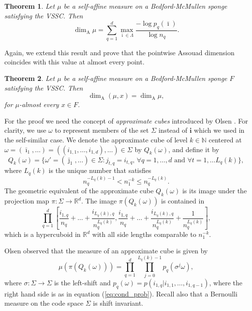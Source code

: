 \documentclass{PRM}
\newcommand{\field}[1]{\mathbb{#1}}
\newcommand{\N}{\field{N}}
\newcommand{\R}{\field{R}}
\theoremstyle{plain}
\newtheorem{thm}{Theorem}[section]
\theoremstyle{definition}
\theoremstyle{remark}
\begin{document}
\begin{thm}\label{thm:bm_formula}
Let $\mu$ be a self-affine measure on a Bedford-McMullen sponge satisfying the VSSC. Then
\begin{equation*}
    \dim_{\mathrm{A}}\mu=\sum_{q=1}^d\max_{\bar{\imath}\in \Lambda}\frac{-\log p_q(\bar{\imath})}{\log n_q}.
\end{equation*}
\end{thm}
Again, we extend this result and prove that the pointwise Assouad dimension coincides with this value at almost every point.

\begin{thm}\label{thm:bm_exact_dimensionality}
Let $\mu$ be a self-affine measure on a Bedford-McMullen sponge $F$ satisfying the VSSC. Then
\begin{equation*}
    \dim_{\mathrm{A}}(\mu,x)=\dim_{\mathrm{A}}\mu,
\end{equation*}
for $\mu$-almost every $x\in F$.
\end{thm}
For the proof we need the concept of \emph{approximate cubes} introduced by Olsen \cite{O}. For clarity, we use $\omega$ to represent members of the set $\Sigma$ instead of $\mathbf{i}$ which we used in the self-similar case. We denote the approximate cube of level $k\in\N$ centered at $\omega=(\bar{\imath}_1,\ldots)=((i_{1,1},\ldots,i_{1,d}),\ldots)\in\Sigma$ by $Q_k(\omega)$, and define it by
\begin{equation*}
    Q_k(\omega)=\{\omega'=(\bar{\jmath}_1,\ldots)\in\Sigma\colon j_{t,q}=i_{t,q},\,\forall q=1,\ldots,d\text{ and }\forall t=1,\ldots L_q(k)\},
\end{equation*}
where $L_q(k)$ is the unique number that satisfies
\begin{equation}\label{eq:approx_cube}
   n_q^{-L_q(k)-1} <n_1^{-k}\leq n_q^{-L_q(k)}.
\end{equation}
The geometric equivalent of the approximate cube $Q_k(\omega)$ is its image under the projection map $\pi:\Sigma\to \R^d$. The image $\pi(Q_k(\omega))$ is contained in
\begin{equation*}
    \prod_{q=1}^d\left[\frac{i_{1,q}}{n_q}+\ldots+\frac{i_{L_q(k),q}}{n_q^{L_q(k)}},\frac{i_{1,q}}{n_q}+\ldots+\frac{i_{L_q(k),q}}{n_q^{L_q(k)}}+\frac{1}{n_q^{L_q(k)}}\right],
\end{equation*}
which is a hypercuboid in $\R^d$ with all side lengths comparable to $n_1^{-k}$.

Olsen \cite{O} observed that the measure of an approximate cube is given by
\begin{equation}\label{eq:appr_cube_msr}
    \mu(\pi(Q_k(\omega)))=\prod_{q=1}^d\prod_{j=0}^{L_q(k)-1}p_q(\sigma^j\omega),
\end{equation}
where $\sigma:\Sigma \to \Sigma$ is the left-shift and $p_q(\omega)=p(i_{1,q}|i_{1,1},\ldots,i_{1,q-1})$, where the right hand side is as in equation (\ref{eq:cond_prob}). Recall also that a Bernoulli measure on the code space $\Sigma$ is shift invariant.
\end{document}

